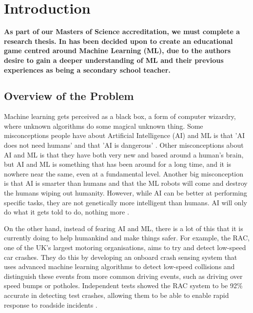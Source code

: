 \chapter{Introduction}
	\label{chap:intro}
	
	\textbf{As part of our Masters of Science accreditation, we must complete a research thesis. In has been decided upon to create an educational game centred around Machine Learning (ML), due to the authors desire to gain a deeper understanding of ML and their previous experiences as being a secondary school teacher.} %
	
	\section{Overview of the Problem}
		\label{sec:overview_of_problem}
	
	Machine learning gets perceived as a black box, a form of computer wizardry, where unknown algorithms do some magical unknown thing. Some misconceptions people have about Artificial Intelligence (AI) and ML is that 'AI does not need humans' and that 'AI is dangerous' \cite{quora5misconcepts}. Other misconceptions about AI and ML is that they have both very new and based around a human's brain, but AI and ML is something that has been around for a long time, and it is nowhere near the same, even at a fundamental level. Another big misconception is that AI is smarter than humans and that the ML robots will come and destroy the humans wiping out humanity. However, while AI can be better at performing specific tasks, they are not genetically more intelligent than humans. AI will only do what it gets told to do, nothing more \cite{quora5misconcepts}.
	
	On the other hand, instead of fearing AI and ML, there is a lot of this that it is currently doing to help humankind and make things safer. For example, the RAC, one of the UK's largest motoring organisations, aims to try and detect low-speed car crashes. They do this by developing an onboard crash sensing system that uses advanced machine learning algorithms to detect low-speed collisions and distinguish these events from more common driving events, such as driving over speed bumps or potholes. Independent tests showed the RAC system to be 92\% accurate in detecting test crashes, allowing them to be able to enable rapid response to roadside incidents \cite{matlanintrotoml}.
	
	
